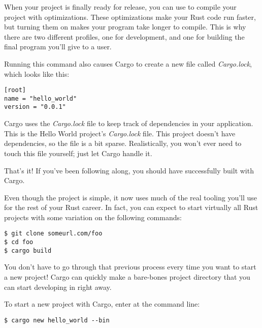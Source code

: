 
When your project is finally ready for release, you can use  to compile your project with optimizations. 
These optimizations make your Rust code run faster, but turning them on makes your program take longer to compile. This is why 
there are two different profiles, one for development, and one for building the final program you'll give to a user.

\blank

Running this command also causes Cargo to create a new file called \emph{Cargo.lock}, which looks like this:

\begin{verbatim}
[root]
name = "hello_world"
version = "0.0.1"
\end{verbatim}

Cargo uses the \emph{Cargo.lock} file to keep track of dependencies in your application. This is the Hello World project's 
\emph{Cargo.lock} file. This project doesn't have dependencies, so the file is a bit sparse. Realistically, you won't ever 
need to touch this file yourself; just let Cargo handle it.

\blank

That's it! If you've been following along, you should have successfully built  with Cargo.

\blank

Even though the project is simple, it now uses much of the real tooling you'll use for the rest of your Rust career. 
In fact, you can expect to start virtually all Rust projects with some variation on the following commands:

\begin{verbatim}
$ git clone someurl.com/foo
$ cd foo
$ cargo build 
\end{verbatim}


You don't have to go through that previous process every time you want to start a new project! Cargo can quickly make a 
bare-bones project directory that you can start developing in right away.

\blank

To start a new project with Cargo, enter  at the command line:

\begin{verbatim}
$ cargo new hello_world --bin
\end{verbatim}

